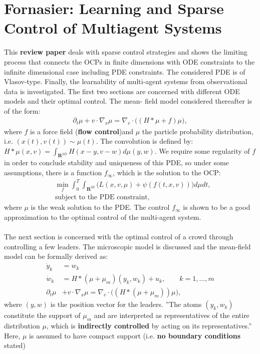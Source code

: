 \documentclass[11pt, a4paper]{article}
\theoremstyle{definition}
\begin{document}
\section{Fornasier: Learning and Sparse Control of Multiagent Systems \cite{Fornasier_20161no1}}
This \textbf{review paper} deals with sparse control strategies and shows the limiting process that connects the OCPs in finite dimensions with ODE constraints to the infinite dimensional case including PDE constraints. The considered PDE is of Vlasov-type. Finally, the learnability of multi-agent systems from observational data is investigated.
The first two sections are concerned with different ODE models and their optimal control.
The mean- field model considered thereafter is of the form:
\begin{align*}
\partial_t \mu + v \cdot \nabla_x \mu = \nabla_v \cdot \bigg( (H \ast \mu + f)\mu\bigg),
\end{align*}
where $f$ is a force field (\textbf{flow control})and $\mu$ the particle probability distribution, i.e. $(x(t),v(t)) \sim \mu(t)$.
The convolution is defined by: $H \ast \mu(x,v) = \int_{\mathbf{R}^{2D}} H(x-y,v-w)d \mu(y,w)$. We require some regularity of $f$ in order to conclude stability and uniqueness of this PDE, so under some assumptions, there is a function $f_\infty$, which is the solution to the OCP:
\begin{align*}
&\min_f \int_0^T \int_{\mathbf{R}^{2d}} \bigg( L(x,v,\mu) + \psi(f(t,x,v)) \bigg)d \mu dt,\\
&\text{subject to the PDE constraint,}
\end{align*}
where $\mu$ is the weak solution to the PDE. The control $f_\infty$ is shown to be a good approximation to the optimal control of the multi-agent system.\\
\\
The next section is concerned with the optimal control of a crowd through controlling a few leaders. The microscopic model is discussed and the mean-field model can be formally derived as:
\begin{align*}
\dot{y}_k &= w_k\\
\dot{w}_k &= H \ast (\mu + \mu_m)(y_k,w_k) + u_k, \qquad k=1,...,m\\
\partial_t \mu &+ v \cdot \nabla_x \mu = \nabla_v \cdot \bigg( (H \ast (\mu + \mu_m))\mu\bigg),
\end{align*}
where $(y,w)$ is the position vector for the leaders. ''The atoms $(y_k,w_k)$ constitute the support of $\mu_m$ and are interpreted as representatives of the entire distribution $\mu$, which is \textbf{indirectly controlled} by acting on its representatives.'' Here, $\mu$ is assumed to have compact support (i.e. \textbf{no boundary conditions} stated) \\
\end{document}
